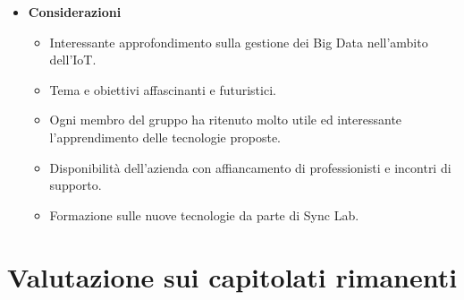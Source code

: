 \documentclass{article}
\begin{document}
\begin{itemize}
    \item[] \textbf{Considerazioni}
    \vspace{-0.2cm}
    \begin{itemize}
        \item Interessante approfondimento sulla gestione dei Big Data nell’ambito dell’IoT.
        \item Tema e obiettivi affascinanti e futuristici.
        \item Ogni membro del gruppo ha ritenuto molto utile ed interessante l’apprendimento delle tecnologie proposte.
        \item Disponibilità dell’azienda con affiancamento di professionisti e incontri di supporto.
        \item Formazione sulle nuove tecnologie da parte di Sync Lab.
    \end{itemize} 

\end{itemize}
    
\vspace{2cm}

\section{Valutazione sui capitolati rimanenti}

\end{document}
